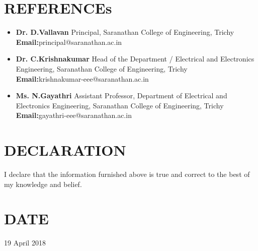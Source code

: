 \documentclass[margin,line]{res}
\begin{document}
\begin{resume}
\section{\sc REFERENCEs}
\begin{itemize}
\item \textbf{Dr. D.Vallavan} Principal, Saranathan College of Engineering, Trichy\\
\textbf{Email:}principal@saranathan.ac.in\\
\item \textbf{Dr. C.Krishnakumar} Head of the Department / Electrical and Electronics Engineering, Saranathan College of Engineering, Trichy\\
\textbf{Email:}krishnakumar-eee@saranathan.ac.in\\
\item \textbf{Ms. N.Gayathri} Assistant Professor, Department of  Electrical and Electronics Engineering, Saranathan College of Engineering, Trichy\\
\textbf{Email:}gayathri-eee@saranathan.ac.in\\
\end{itemize}

\section{\sc DECLARATION}
I declare that the information furnished above is true and correct to the best of my knowledge and belief.\\

\section{\sc DATE}
19 April 2018\\

\end{resume}
\end{document}
